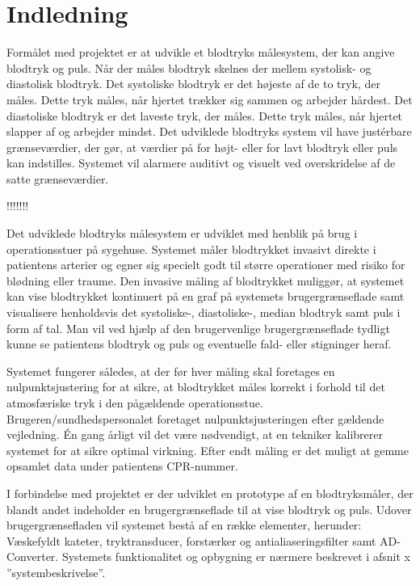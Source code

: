 \chapter{Indledning}
Formålet med projektet er at udvikle et blodtryks målesystem, der kan angive blodtryk og puls. Når der måles blodtryk skelnes der mellem systolisk- og diastolisk blodtryk. Det systoliske blodtryk er det højeste af de to tryk, der måles. Dette tryk måles, når hjertet trækker sig sammen og arbejder hårdest. Det diastoliske blodtryk er det laveste tryk, der måles. Dette tryk måles, når hjertet slapper af og arbejder mindst. Det udviklede blodtryks system vil have justérbare grænseværdier, der gør, at værdier på for højt- eller for lavt blodtryk eller puls kan indstilles. Systemet vil alarmere auditivt og visuelt ved overskridelse af de satte grænseværdier.

!!!!!!!

Det udviklede blodtryks målesystem er udviklet med henblik på brug i operationsstuer på sygehuse. Systemet måler blodtrykket invasivt direkte i patientens arterier og egner sig specielt godt til større operationer med risiko for blødning eller traume. Den invasive måling af blodtrykket muliggør, at systemet kan vise blodtrykket kontinuert på en graf på systemets brugergrænseflade samt visualisere henholdsvis det systoliske-, diastoliske-, median blodtryk samt puls i form af tal. Man vil ved hjælp af den brugervenlige brugergrænseflade tydligt kunne se patientens blodtryk og puls og eventuelle fald- eller stigninger heraf.

Systemet fungerer således, at der før hver måling skal foretages en nulpunktsjustering for at sikre, at blodtrykket måles korrekt i forhold til det atmosfæriske tryk i den pågældende operationsstue. Brugeren/sundhedspersonalet foretaget nulpunktsjusteringen efter gældende vejledning. Én gang årligt vil det være nødvendigt, at en tekniker kalibrerer systemet for at sikre optimal virkning. Efter endt måling er det muligt at gemme opsamlet data under patientens CPR-nummer.

I forbindelse med projektet er der udviklet en prototype af en blodtryksmåler, der blandt andet indeholder en brugergrænseflade til at vise blodtryk og puls. Udover brugergrænsefladen vil systemet bestå af en række elementer, herunder: Væskefyldt kateter, tryktransducer, forstærker og antialiaseringsfilter samt AD-Converter. Systemets funktionalitet og opbygning er nærmere beskrevet i afsnit x ”systembeskrivelse”.  


